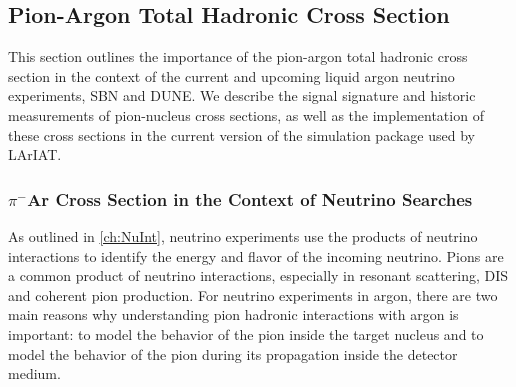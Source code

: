 
\subsection{Pion-Argon Total Hadronic Cross Section}
This section outlines the importance of the pion-argon total hadronic cross section in the context of the current and upcoming liquid argon neutrino experiments, SBN and DUNE. %
 We describe the signal signature and historic measurements of pion-nucleus cross sections, as well as the implementation of these cross sections in the current version of the simulation package used by LArIAT.

\subsubsection{$\pi^{-}$Ar Cross Section in the Context of Neutrino Searches}
As outlined in \ref{ch:NuInt}, neutrino experiments use the products of neutrino interactions to identify the energy and flavor of the incoming neutrino.
Pions are a common product of neutrino interactions, especially in resonant scattering, DIS and coherent pion production. For neutrino experiments in argon, there are two main reasons why understanding pion hadronic interactions with argon is important: to model the behavior of the pion inside the target nucleus  and to model the behavior of the pion during its propagation inside the detector medium. 

